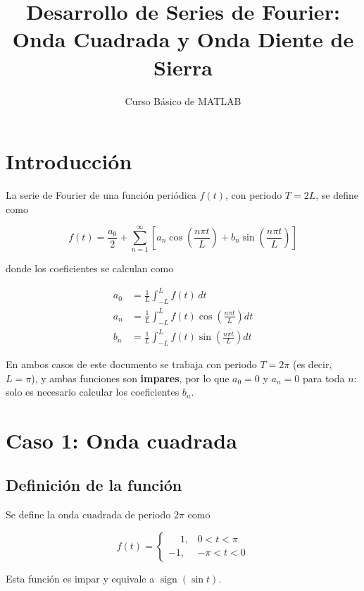 \documentclass[11pt]{article}
\title{Desarrollo de Series de Fourier: \\ Onda Cuadrada y Onda Diente de Sierra}
\author{Curso Básico de MATLAB}
\date{}
\begin{document}
\maketitle

\section{Introducción}

La serie de Fourier de una función periódica $f(t)$, con periodo
$T = 2L$, se define como

\begin{equation}
f(t) = \frac{a_0}{2} + \sum_{n=1}^{\infty} \left[ a_n \cos\!\left(\frac{n\pi t}{L}\right) + b_n \sin\!\left(\frac{n\pi t}{L}\right) \right]
\end{equation}

donde los coeficientes se calculan como

\begin{align}
a_0 &= \frac{1}{L} \int_{-L}^{L} f(t)\, dt \\
a_n &= \frac{1}{L} \int_{-L}^{L} f(t) \cos\!\left(\frac{n\pi t}{L}\right) dt \\
b_n &= \frac{1}{L} \int_{-L}^{L} f(t) \sin\!\left(\frac{n\pi t}{L}\right) dt
\end{align}

En ambos casos de este documento se trabaja con periodo $T = 2\pi$
(es decir, $L = \pi$), y ambas funciones son \textbf{impares}, por
lo que $a_0 = 0$ y $a_n = 0$ para toda $n$: solo es necesario
calcular los coeficientes $b_n$.

\section{Caso 1: Onda cuadrada}

\subsection{Definición de la función}

Se define la onda cuadrada de periodo $2\pi$ como

\begin{equation}
f(t) =
\begin{cases}
\phantom{-}1, & 0 < t < \pi \\
-1, & -\pi < t < 0
\end{cases}
\end{equation}

Esta función es impar y equivale a $\operatorname{sign}(\sin t)$.
\end{document}
